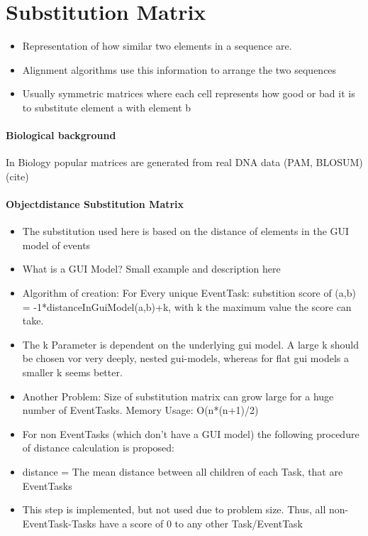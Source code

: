 \section{Substitution Matrix}
	\begin{itemize}
		\item Representation of how similar two elements in a sequence are. 
		\item Alignment algorithms use this information to arrange the two sequences 
		\item Usually symmetric matrices where each cell represents how good or bad it is to substitute element a with element b  
	\end{itemize}
	\paragraph{Biological background}
	In Biology popular matrices are generated from real DNA data (PAM, BLOSUM) (cite)
	\paragraph{Objectdistance Substitution Matrix}
	\begin{itemize}
		\item The substitution used here is based on the distance of elements in the GUI model of events
		\item What is a GUI Model? Small example and description here
		\item Algorithm of creation: For Every unique EventTask: substition score of (a,b) = -1*distanceInGuiModel(a,b)+k, with k the maximum value the score can take.
		\item The k Parameter is dependent on the underlying gui model. A large k should be chosen vor very deeply, nested gui-models, whereas for flat gui models a smaller k seems better. 
		\item Another Problem: Size of substitution matrix can grow large for a huge number of EventTasks. Memory Usage: O(n*(n+1)/2) 
		\item For non EventTasks (which don't have a GUI model) the following procedure of distance calculation is proposed:
		\item distance = The mean distance between all children of each Task, that are EventTasks
		\item This step is implemented, but not used due to problem size. Thus, all non-EventTask-Tasks have a score of 0 to any other Task/EventTask
	\end{itemize}

